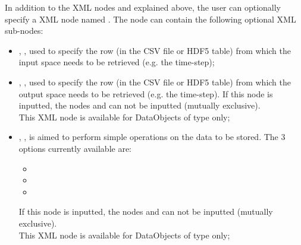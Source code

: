 In addition to the XML nodes  and  explained above, the user
can optionally specify a XML node named  . The   node can
contain the following optional XML sub-nodes:

\begin{itemize}
  \item {}, , used to
       specify  the row (in the CSV file or HDF5 table) from which the input space
      needs to be retrieved (e.g. the time-step);
  \item {}, , used to
       specify  the row (in the CSV file or HDF5 table) from which the output space
      needs to be retrieved (e.g. the time-step). If this node is inputted, the nodes
        and   can not be inputted (mutually exclusive).
     \\\nb This XML node is available for DataObjects of type  only;
  \item {}, , is aimed to perform
       simple operations on the data to be stored.
       The 3 options currently available are:
       \begin{itemize}
          \item {}
          \item {}
          \item {}
       \end{itemize}
       If this node is inputted, the nodes
        and   can not be inputted (mutually exclusive).
       \\\nb This XML node is available for DataObjects of type  only;

\end{itemize}
